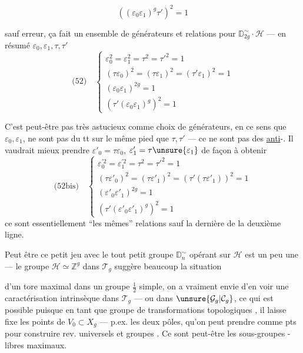 


\[
((\varepsilon_0\varepsilon_1)^g\tau')^2=1
\]

sauf erreur, ça fait un ensemble de générateurs et relations pour $\mathbb D_{2g}^{\sim}\cdot\mathcal H$ --- en résumé $\varepsilon_0,\varepsilon_1,\tau,\tau'$
\[
\text{(52)}\quad
\left\{
\begin{array}{l}
\varepsilon_0^2=\varepsilon_1^2=\tau^2=\tau'^2=1\\
(\tau\varepsilon_0)^2=(\tau\varepsilon_1)^2=(\tau'\varepsilon_1)^2=1\\
(\varepsilon_0\varepsilon_1)^{2g}=1\\
(\tau'(\varepsilon_0\varepsilon_1)^g)^2=1
\end{array}
\right.
\]

C'est peut-être pas très astucieux comme choix de générateurs, en ce sens que $\varepsilon_0,\varepsilon_1$, ne sont pas du tt sur le même pied que $\tau,\tau'$ --- ce ne sont pas des \uline{anti}-. Il vaudrait mieux prendre $\varepsilon'_0=\tau\varepsilon_0$, $\varepsilon'_1=\tau\unsure{\varepsilon_1}$ de façon à obtenir
\[
\text{(52bis)}\quad
\left\{
\begin{array}{l}
\varepsilon_0^{\prime 2}=\varepsilon_1^{\prime 2}=\tau^2=\tau'^2=1\\
(\tau\varepsilon'_0)^2=(\tau\varepsilon'_1)^2=(\tau'(\tau\varepsilon'_1))^2=1\\
(\varepsilon'_0\varepsilon'_1)^{2g}=1\\
(\tau'(\varepsilon'_0\varepsilon'_1)^g)^2=1
\end{array}
\right.
\]
ce sont essentiellement ``les mêmes'' relations sauf la dernière de la deuxième ligne.

Peut être ce petit jeu avec le tout petit groupe $\mathbb D_n^{\sim}$ opérant sur $\mathcal H$ est un peu une  --- le groupe $\mathcal H\simeq\mathbb Z^g$ dans $\mathcal T_g$ suggère beaucoup la situation



d'un tore maximal dans un groupe $\frac12$ simple, on a vraiment envie d'en voir une caractérisation intrinsèque dans $\mathcal T_g$ --- ou dans $\unsure{\mathcal G_g|\mathcal C_g}$, ce qui est possible puisque  en tant que groupe de transformations topologiques , il laisse fixe les points de $V_0\subset X_g$ --- p.ex. les deux pôles, qu'on peut prendre comme pts  pour construire rev. universels et groupes . Ce sont peut-être les sous-groupes -libres maximaux.

